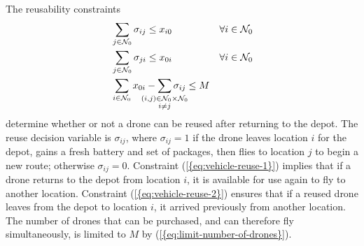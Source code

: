 \documentclass[journal]{IEEEtran}
\begin{document}
The reusability constraints
\begin{subequations}
\label{eq:vehicle-reuse}
\begin{align}
& \sum_{j \in {\ensuremath{{\ensuremath{\mathcal{N}}}_{0}}}} {\ensuremath{\sigma_{{i} {j}}}} \leq {\ensuremath{x_{{i} {0}}}} & {\ensuremath{\forall {i} \in {\ensuremath{{\ensuremath{\mathcal{N}}}_{0}}}}} \label{eq:vehicle-reuse-1} \\
& \sum_{j \in {\ensuremath{{\ensuremath{\mathcal{N}}}_{0}}}} {\ensuremath{\sigma_{{j} {i}}}} \leq {\ensuremath{x_{{0} {i}}}} & {\ensuremath{\forall {i} \in {\ensuremath{{\ensuremath{\mathcal{N}}}_{0}}}}} \label{eq:vehicle-reuse-2} \\
& \sum_{i \in {\ensuremath{{\ensuremath{\mathcal{N}}}_{0}}}} {\ensuremath{x_{{0} {i}}}} - \sum_{\mathclap{ \substack{(i,j) \in {\ensuremath{{\ensuremath{\mathcal{N}}}_{0}}} \times {\ensuremath{{\ensuremath{\mathcal{N}}}_{0}}} \\ i \neq j}}} {\ensuremath{\sigma_{{i} {j}}}} \leq {\ensuremath{M}} & \label{eq:limit-number-of-drones}
\end{align}
\end{subequations}
determine whether or not a drone can be reused after returning to the depot. The reuse decision variable is ${\ensuremath{\sigma_{{i} {j}}}}$, where ${\ensuremath{\sigma_{{i} {j}}}}=1$ if the drone leaves location $i$ for the depot, gains a fresh battery and set of packages, then flies to location $j$ to begin a new route; otherwise ${\ensuremath{\sigma_{{i} {j}}}}=0$. Constraint {(\ref{{eq:vehicle-reuse-1}})} implies that if a drone returns to the depot from location $i$, it is available for use again to fly to another location. Constraint {(\ref{{eq:vehicle-reuse-2}})} ensures that if a reused drone leaves from the depot to location $i$, it arrived previously from another location. The number of drones that can be purchased, and can therefore fly simultaneously, is limited to ${\ensuremath{M}}$ by {(\ref{{eq:limit-number-of-drones}})}.
\end{document}
